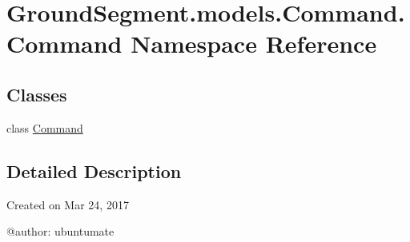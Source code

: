 \hypertarget{namespace_ground_segment_1_1models_1_1_command_1_1_command}{}\section{Ground\+Segment.\+models.\+Command.\+Command Namespace Reference}
\label{namespace_ground_segment_1_1models_1_1_command_1_1_command}
\subsection*{Classes}
\begin{DoxyCompactItemize}
\item 
class \hyperlink{class_ground_segment_1_1models_1_1_command_1_1_command_1_1_command}{Command}
\end{DoxyCompactItemize}


\subsection{Detailed Description}
\begin{DoxyVerb}Created on Mar 24, 2017

@author: ubuntumate
\end{DoxyVerb}
 